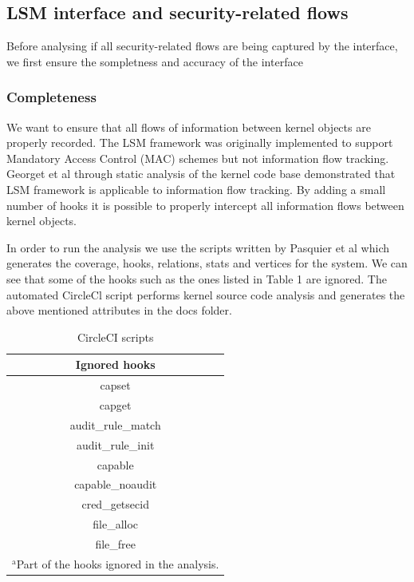 \documentclass{IEEEtran}
\begin{document}
\subsection{LSM interface and security-related flows}
Before analysing if all security-related flows are being captured by the interface, we first ensure the sompletness and accuracy of the interface

\subsubsection{Completeness}
We want to ensure that all flows of information between kernel objects are properly recorded. The LSM framework \cite{b14} was originally implemented to support Mandatory Access Control (MAC) schemes but not information flow tracking. Georget et al \cite{b3} through static analysis of the kernel code base demonstrated that LSM framework is applicable to information flow tracking. By adding a small number of hooks it is possible to properly intercept all information flows between kernel objects.

In order to run the analysis we use the scripts written by Pasquier et al \cite{b14} which generates the coverage, hooks, relations, stats and vertices for the system. We can see that some of the hooks such as the ones listed in Table 1 are ignored. The automated CircleCl script performs kernel source code analysis and generates the above mentioned attributes in the docs folder. 


\begin{table}[htbp]
	\caption{CircleCI scripts}
	\begin{center}
		\begin{tabular}{|c|}
			\hline
			\textbf{Ignored hooks} \\
		\hline capset \\
		\hline capget \\
		\hline audit\_rule\_match \\
			\hline audit\_rule\_init \\
			\hline capable \\
				\hline capable\_noaudit \\
					\hline cred\_getsecid \\
						\hline file\_alloc\\
							\hline file\_free \\
			\hline
			\multicolumn{4}{l}{$^{\mathrm{a}}$Part of the hooks ignored in the analysis.}
		\end{tabular}
		\label{tab1}
	\end{center}
\end{table}
\end{document}
